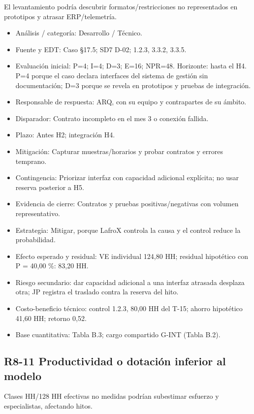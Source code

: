 El levantamiento podría descubrir formatos/restricciones no representados en prototipos y atrasar ERP/telemetría.

\begin{itemize}[leftmargin=*,itemsep=3pt]
\item Análisis / categoría: Desarrollo / Técnico.
\item Fuente y EDT: Caso §17.5; SD7 D-02; 1.2.3, 3.3.2, 3.3.5.
\item Evaluación inicial: P=4; I=4; D=3; E=16; NPR=48. Horizonte: hasta el H4. P=4 porque el caso declara interfaces del sistema de gestión sin documentación; D=3 porque se revela en prototipos y pruebas de integración.
\item Responsable de respuesta: ARQ, con su equipo y contrapartes de su ámbito.
\item Disparador: Contrato incompleto en el mes 3 o conexión fallida.
\item Plazo: Antes H2; integración H4.
\item Mitigación: Capturar muestras/horarios y probar contratos y errores temprano.
\item Contingencia: Priorizar interfaz con capacidad adicional explícita; no usar reserva posterior a H5.
\item Evidencia de cierre: Contratos y pruebas positivas/negativas con volumen representativo.
\item Estrategia: Mitigar, porque LafroX controla la causa y el control reduce la probabilidad.
\item Efecto esperado y residual: VE individual 124,80 HH; residual hipotético con P = 40,00 \%: 83,20 HH.
\item Riesgo secundario: dar capacidad adicional a una interfaz atrasada desplaza otra; JP registra el traslado contra la reserva del hito.
\item Costo-beneficio técnico: control 1.2.3, 80,00 HH del T-15; ahorro hipotético 41,60 HH; retorno 0,52.
\item Base cuantitativa: Tabla B.3; cargo compartido G-INT (Tabla B.2).
\end{itemize}

\subsection*{R8-11 \textemdash{} Productividad o dotación inferior al modelo}

Clases HH/128 HH efectivas no medidas podrían subestimar esfuerzo y especialistas, afectando hitos.

